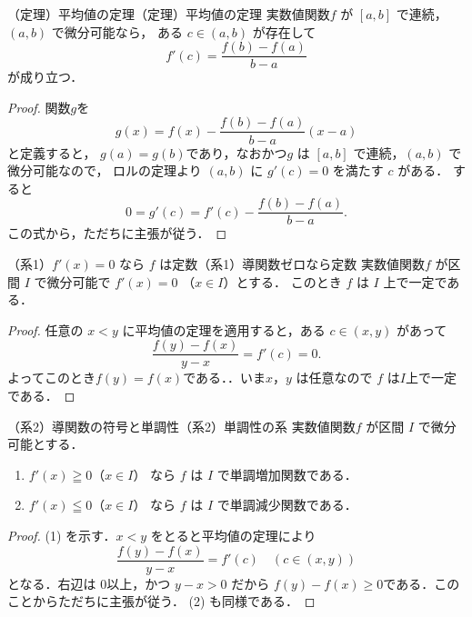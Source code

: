 \begin{example}{（定理）平均値の定理}{（定理）平均値の定理}
  実数値関数$f$ が $[a,b]$ で連続，$(a,b)$ で微分可能なら，
  ある $c \in(a,b)$ が存在して
  \[
    f'(c)=\frac{f(b)-f(a)}{b-a}
  \]
  が成り立つ．
\end{example}

\begin{tleftbar}
\begin{proof}
  関数$g$を
  \[
    g(x)=f(x)-\frac{f(b)-f(a)}{b-a}(x-a)
  \]
  と定義すると， $g(a)=g(b)$であり，なおかつ$g$ は $[a,b]$ で連続，$(a,b)$ で微分可能なので，
  ロルの定理より $(a,b)$ に $g'(c)=0$ を満たす $c$ がある．
  すると
  \[
    0=g'(c)=f'(c)-\frac{f(b)-f(a)}{b-a}.
  \]
  この式から，ただちに主張が従う．
\end{proof}
\end{tleftbar}

\begin{example}{（系1）$f'(x)=0$ なら $f$ は定数}{（系1）導関数ゼロなら定数}
  実数値関数$f$ が区間 $I$ で微分可能で $f'(x)=0$ （$x \in I$）とする．
  このとき $f$ は $I$ 上で一定である．
\end{example}

\begin{tleftbar}
\begin{proof}
  任意の $x<y$ に平均値の定理を適用すると，ある $c\in(x,y)$ があって
  \[
     \frac{f(y)-f(x)}{y-x}=f'(c)=0.
  \]
  よってこのとき$f(y)=f(x)$である．．いま$x$，$y$ は任意なので $f$ は$I$上で一定である．
\end{proof}
\end{tleftbar}

\begin{example}{（系2）導関数の符号と単調性}{（系2）単調性の系}
  実数値関数$f$ が区間 $I$ で微分可能とする．
  \begin{enumerate}
    \item $f'(x)\geqq 0$（$x\in I$） なら $f$ は $I$ で単調増加関数である．
    \item $f'(x)\leqq 0$（$x\in I$） なら $f$ は $I$ で単調減少関数である．
  \end{enumerate}
\end{example}

\begin{tleftbar}
\begin{proof}
  (1) を示す．$x<y$ をとると平均値の定理により
  \[
     \frac{f(y)-f(x)}{y-x}=f'(c) \quad (c\in(x,y))
  \]
  となる．右辺は $0$以上，かつ $y-x>0$ だから $f(y)-f(x)\ge 0$である．このことからただちに主張が従う．
  (2) も同様である．
\end{proof}
\end{tleftbar}

